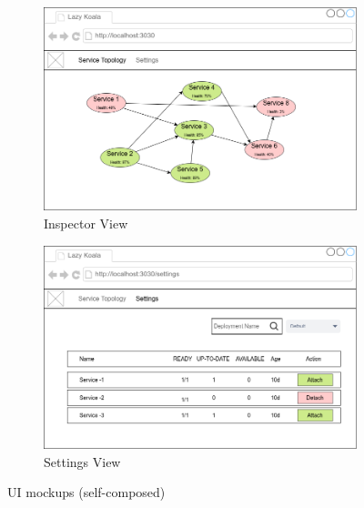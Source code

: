 \begin{figure}[H]
    \centering
    \begin{subfigure}[b]{0.75\textwidth}
        \centering
        \includegraphics[width=\textwidth]{assets/system-design/ui-home.png}
        \caption{Inspector View}
        \label{fig:ui-home}
    \end{subfigure}
    \hfill
    \begin{subfigure}[b]{0.75\textwidth}
        \centering
        \includegraphics[width=\textwidth]{assets/system-design/ui-settings.png}
        \caption{Settings View}
        \label{fig:ui-settings}
    \end{subfigure}
    \hfill
    \caption{UI mockups (self-composed)}
\end{figure}